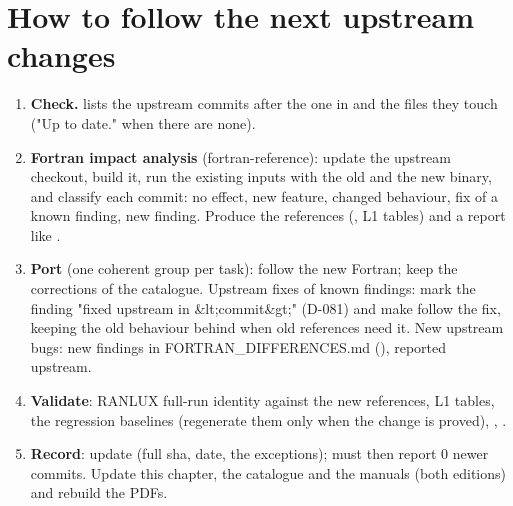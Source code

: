 \section{\texorpdfstring{How to follow the next upstream changes}{How to follow the next upstream changes}}\label{translation_report-07u5ffollowingu5fupstream:72-how-to-follow-the-next-upstream-changes}
\begin{enumerate}
\item \textbf{Check.}  lists the upstream commits after the one in  and the files
they touch ("Up to date." when there are none).
\item \textbf{Fortran impact analysis} (fortran-reference): update the upstream checkout, build it, run the existing inputs with
the old and the new binary, and classify each commit: no effect, new feature, changed behaviour, fix of a known
finding, new finding. Produce the references (, L1 tables) and a report like
.
\item \textbf{Port} (one coherent group per task): follow the new Fortran; keep the corrections of the catalogue. Upstream fixes
of known findings: mark the finding "fixed upstream in \&lt;commit\&gt;" (D-081) and make  follow the fix,
keeping the old behaviour behind  when old references need it. New upstream bugs: new findings in
FORTRAN\_\allowbreak{}DIFFERENCES.md (), reported upstream.
\item \textbf{Validate}: RANLUX full-run identity against the new references, L1 tables, the regression baselines (regenerate
them only when the change is proved), , .
\item \textbf{Record}: update  (full sha, date, the exceptions);  must then report
0 newer commits. Update this chapter, the catalogue and the manuals (both editions) and rebuild the PDFs.
\end{enumerate}
